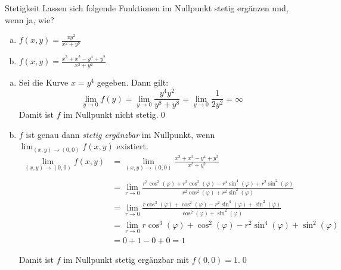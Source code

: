 \documentclass[german]{../spicker}
\begin{document}
\begin{example}{Stetigkeit}
    Lassen sich folgende Funktionen im Nullpunkt stetig ergänzen und, wenn ja, wie?
    \begin{enumerate}[a)]
        \item $f(x,y) = \frac{xy^2}{x^2 + y^8}$
        \item $f(x,y) = \frac{x^3 + x^2 - y^4 + y^2}{x^2 + y^2}$
    \end{enumerate}

    \exampleseparator

    \begin{enumerate}[a)]
        \item
              Sei die Kurve $x = y^4$ gegeben.
              Dann gilt:
              $$
                  \lim_{y\to 0} f(y) = \lim_{y\to 0} \frac{y^4y^2}{y^8+y^8} = \lim_{y\to 0} \frac{1}{2y^2} = \infty
              $$
              Damit ist $f$ im Nullpunkt nicht stetig.\qed
        \item
              $f$ ist genau dann \emph{stetig ergänzbar} im Nullpunkt, wenn $\lim_{(x,y) \to (0,0)} f(x,y)$ existiert.
              $$
                  \begin{aligned}
                      \lim_{(x,y) \to (0,0)} f(x,y) & = \lim_{(x,y) \to (0,0)} \frac{x^3 + x^2 - y^4 + y^2}{x^2 + y^2}                                                                                    \\                                                                        \\
                                                    & =  \lim_{r \to 0} \frac{r^3\cos^3(\varphi) + r^2\cos^2(\varphi) - r^4\sin^4(\varphi) + r^2\sin^2(\varphi)}{r^2\cos^2(\varphi) + r^2\sin^2(\varphi)} \\
                                                    & =  \lim_{r \to 0} \frac{r\cos^3(\varphi) + \cos^2(\varphi) - r^2\sin^4(\varphi) + \sin^2(\varphi)}{\cos^2(\varphi) + \sin^2(\varphi)}               \\
                                                    & =  \lim_{r \to 0} r\cos^3(\varphi) + \cos^2(\varphi) - r^2\sin^4(\varphi) + \sin^2(\varphi)                                                         \\
                                                    & =  0 + 1 - 0 + 0 = 1
                  \end{aligned}
              $$

              Damit ist $f$ im Nullpunkt stetig ergänzbar mit $f(0, 0) = 1$.\qed
    \end{enumerate}
\end{example}
\end{document}

